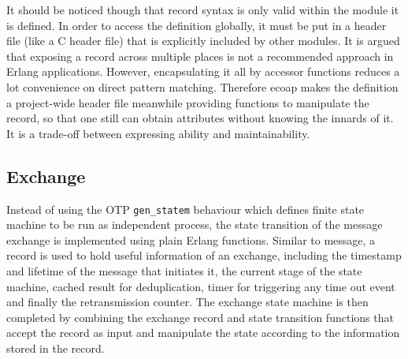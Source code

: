 
It should be noticed though that record syntax is only valid within the module it is defined. In order to access the definition globally, it must be put in a header file (like a C header file) that is explicitly included by other modules. It is argued that exposing a record across multiple places is not a recommended approach in Erlang applications. However, encapsulating it all by accessor functions reduces a lot convenience on direct pattern matching. Therefore ecoap makes the definition a project-wide header file meanwhile providing functions to manipulate the record, so that one still can obtain attributes without knowing the innards of it. It is a trade-off between expressing ability and maintainability. 

\subsection{Exchange}\label{exchange_implementation}

Instead of using the OTP \verb|gen_statem| behaviour which defines finite state machine to be run as independent process, the state transition of the message exchange is implemented using plain Erlang functions. Similar to message, a record is used to hold useful information of an exchange, including the timestamp and lifetime of the message that initiates it, the current stage of the state machine, cached result for deduplication, timer for triggering any time out event and finally the retransmission counter. The exchange state machine is then completed by combining the exchange record and state transition functions that accept the record as input and manipulate the state according to the information stored in the record.

